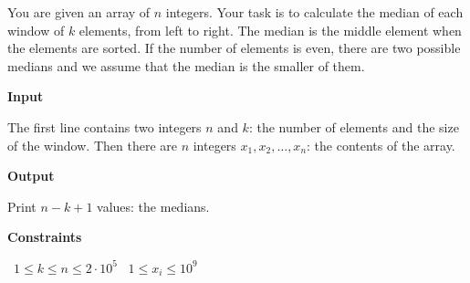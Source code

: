 You are given an array of $n$ integers. Your task is to calculate the median of each window of $k$ elements, from left to right.
The median is the middle element when the elements are sorted. If the number of elements is even, there are two possible medians and we assume that the median is the smaller of them.

\vspace{0.3cm}\noindent\textbf{Input}

The first line contains two integers $n$ and $k$: the number of elements and the size of the window.
Then there are $n$ integers $x_1,x_2,\ldots,x_n$: the contents of the array.

\vspace{0.3cm}\noindent\textbf{Output}

Print $n-k+1$ values: the medians.

\vspace{0.3cm}\noindent\textbf{Constraints}

\textbullet\ $1 \le k \le n \le 2 \cdot 10^5$
\textbullet\ $1 \le x_i \le 10^9$